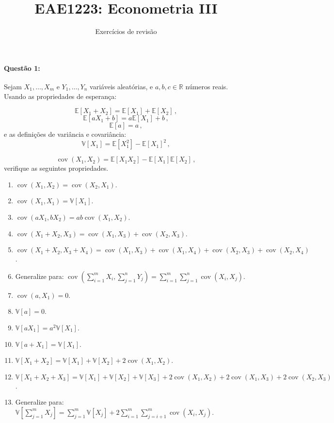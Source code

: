 \documentclass[10pt,a4paper]{article}
\title{\large EAE1223: Econometria III}
\author{\normalsize Exercícios de revisão}
\date{}
\begin{document}
	\maketitle
	\paragraph{Questão 1:} Sejam $X_1,\ldots,X_m$ e $Y_1,\ldots, Y_n$ variáveis aleatórias, e $a,b,c \in \mathbb{R}$ números reais. Usando as propriedades de esperança:
	
	$$\mathbb{E}[X_1 + X_2] = \mathbb{E}[X_1] + \mathbb{E}[X_2] \, ,$$
	$$\mathbb{E}[aX_1 + b] = a\mathbb{E}[X_1] + b \, ,$$
	$$\mathbb{E}[a] = a \, ,$$
	e as definições de variância e covariância:
		$$\mathbb{V}[X_1] = \mathbb{E}[X_1^2] - \mathbb{E}[X_1]^2\,,$$

$$\operatorname{cov}(X_1,X_2) = \mathbb{E}[X_1X_2] - \mathbb{E}[X_1]\mathbb{E}[X_2]\,,$$
verifique as seguintes propriedades.

\begin{enumerate}
	\item $\operatorname{cov}(X_1,X_2) = \operatorname{cov}(X_2,X_1)$.
	\item $\operatorname{cov}(X_1,X_1) =  \mathbb{V}[X_1]$.
	\item $\operatorname{cov}(aX_1,bX_2) =  ab\operatorname{cov}(X_1,X_2)$.
	\item $\operatorname{cov}(X_1 + X_2,X_3) =  \operatorname{cov}(X_1,X_3) + \operatorname{cov}(X_2,X_3)$.
	\item $\operatorname{cov}(X_1 + X_2,X_3 + X_4) = \operatorname{cov}(X_1,X_3) + \operatorname{cov}(X_1,X_4) + \operatorname{cov}(X_2,X_3) + \operatorname{cov}(X_2,X_4)$.
	\item Generalize para: $\operatorname{cov}(\sum_{i=1}^mX_i,\sum_{j=1}^n Y_j) = \sum_{i=1}^{m}\sum_{j=1}^{n} \operatorname{cov}(X_i,X_j)$. 
	\item $\operatorname{cov}(a,X_1) = 0$.
	\item $\mathbb{V}[a] = 0$.
	\item $\mathbb{V}[aX_1] = a^2 \mathbb{V}[X_1]$.
	\item $\mathbb{V}[a + X_1] = \mathbb{V}[X_1]$.
	\item $\mathbb{V}[X_1 + X_2] = \mathbb{V}[X_1] + \mathbb{V}[X_2] + 2 \operatorname{cov}(X_1,X_2)$.
	\item $\mathbb{V}[X_1 + X_2 + X_3] = \mathbb{V}[X_1] + \mathbb{V}[X_2] +  \mathbb{V}[X_3]+ 2 \operatorname{cov}(X_1,X_2) + 2 \operatorname{cov}(X_1,X_3) + 2 \operatorname{cov}(X_2,X_3)$.
	\item Generalize para: $\mathbb{V}[\sum_{j=1}^{m}X_j] = \sum_{j=1}^m \mathbb{V}[X_j] + 2\sum_{i=1}^m \sum_{j=i+1}^m \operatorname{cov}(X_i,X_j)$.

\end{enumerate}
\end{document}
